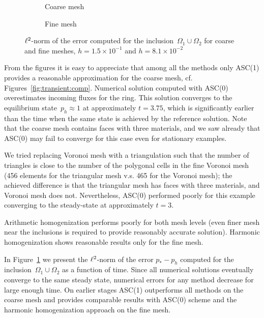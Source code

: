 \begin{figure}[h]
	\centering
	\begin{subfigure}{.8\linewidth}
		\centering
		\caption{Coarse mesh}
	\end{subfigure}%
	\par
	\begin{subfigure}{.8\linewidth}
		\centering
		\caption{Fine mesh}	
	\end{subfigure}%
	\caption{${\ell^2}$-norm of the error computed for the inclusion~$\Omega_1 \cup \Omega_2$ for coarse and fine meshes, $h = 1.5 \times 10^{-1}$ and $h = 8.1 \times 10^{-2}$ \label{fig:transient:err}}
\end{figure}

From the figures it is easy to appreciate  that among all the methods only  ASC(1)  provides a reasonable approximation for the coarse mesh, cf. Figures~\ref{fig:transient:comp}.
Numerical solution computed with ASC(0) overestimates incoming fluxes for the ring. This solution converges to the equilibrium state~$p_h \approx 1$ at approximately $t = 3.75$, which is significantly earlier than the time when the same state is achieved by the reference solution. Note that the coarse mesh contains faces with three materials, and we saw already that ASC(0) may fail to converge for this case even for stationary examples.

We tried replacing Voronoi mesh with a triangulation such that the number of triangles is close to the number of the polygonal cells in the fine Voronoi mesh (456 elements for the triangular mesh v.s. 465 for the Voronoi mesh); the achieved difference is that the triangular mesh has faces with three materials, and Voronoi mesh does not. Nevertheless, ASC(0) performed poorly for this example converging to the steady-state at approximately $t = 3$.
	
Arithmetic homogenization performs poorly for both mesh levels (even finer mesh near the inclusions is required to provide reasonably accurate solution). Harmonic homogenization shows reasonable results only for the fine mesh.

In Figure~\ref{fig:transient:err} we present the ${\ell^2}$-norm of the error $p_* - p_h$ computed for the inclusion~$\Omega_1 \cup \Omega_2$ as a function of time. Since all numerical solutions eventually converge to the same steady state, numerical errors for any method decrease for large enough time. On earlier stages ASC(1) outperforms all methods on the coarse mesh and provides comparable results with ASC(0) scheme and the harmonic homogenization approach on the fine mesh.

